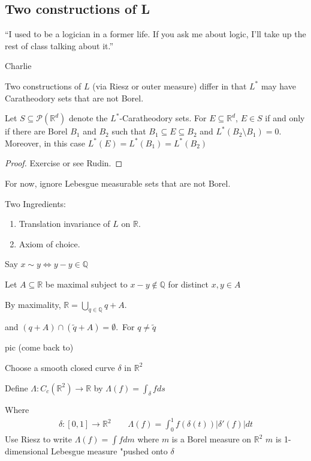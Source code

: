 \subsection{Two constructions of L}
\epigraph{``I used to be a logician in a former life. If you ask me about logic, I'll take up the rest of class talking about it.''}{Charlie}

Two constructions of $L$ (via Riesz or outer measure) differ in that $L^*$ may have Caratheodory sets that are not Borel.

\begin{theorem}
	Let $S \subseteq \mathcal{P}(\mathbb{R}^d)$ denote the $L^*$-Caratheodory sets. For $E \subseteq
	\mathbb{R}^d$, $E \in S$ if and only if there are Borel $B_1$ and $B_2$ such that $B_1 \subseteq E \subseteq B_2$ and
	$L^*(B_2 \setminus B_1) = 0$. Moreover, in this case  $L^*(E) = L^*(B_1) = L^*(B_2)$
\end{theorem}
\begin{proof}
	Exercise or see Rudin.
\end{proof}
For now, ignore Lebesgue measurable sets that are not Borel.

\begin{example}
	Two Ingredients:
	\begin{enumerate}
		\item Translation invariance of $L$ on $\mathbb{R}$.
		\item Axiom of choice.
	\end{enumerate}

	Say $x \sim y \iff y - y \in  \mathbb{Q}$

	Let $A \subseteq \mathbb{R}$ be maximal subject to $x - y \notin \mathbb{Q}$ for distinct $x,y \in A$

	By maximality,  $\mathbb{R} = \bigcup_{q \in \mathbb{Q}} q + A$.

	and $(q + A) \cap (\tilde{q} + A) = \emptyset$.\,  For $q \neq \tilde{q}$
\end{example}
pic (come back to)

\begin{definition}
	Choose a smooth closed curve $\delta$ in $\mathbb{R}^2$

	Define $\Lambda : C_c(\mathbb{R}^2) \to \mathbb{R}$ by $\Lambda (f) = \int_{\delta} f ds$

	Where
	\begin{align*}
		\delta :[0,1] \to \mathbb{R}^2 \qquad \Lambda (f) = \int_{0}^{1} f(\delta(t)) |\delta'(f) |dt
	\end{align*}
	Use Riesz to write $\Lambda (f) = \int f dm$  where $m$ is a Borel measure on $\mathbb{R}^2$
	$m$ is 1-dimensional Lebesgue measure "pushed onto $\delta$
\end{definition}


